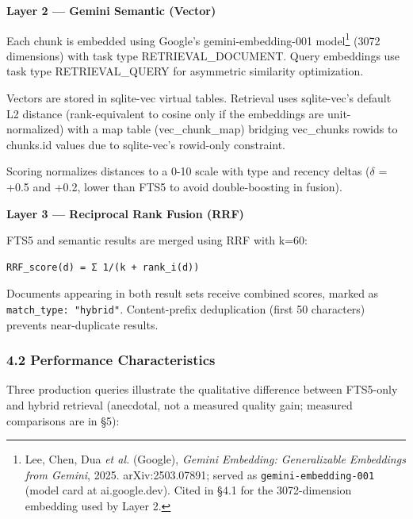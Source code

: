 \documentclass[
]{article}
\begin{document}
\textbf{Layer 2 --- Gemini Semantic (Vector)}

Each chunk is embedded using Google's gemini-embedding-001
model\footnote{Lee, Chen, Dua \emph{et al.} (Google), \emph{Gemini
  Embedding: Generalizable Embeddings from Gemini}, 2025.
  arXiv:2503.07891; served as \texttt{gemini-embedding-001} (model card
  at ai.google.dev). Cited in §4.1 for the 3072-dimension embedding used
  by Layer 2.} (3072 dimensions) with task type RETRIEVAL\_DOCUMENT.
Query embeddings use task type RETRIEVAL\_QUERY for asymmetric
similarity optimization.

Vectors are stored in sqlite-vec virtual tables. Retrieval uses
sqlite-vec's default L2 distance (rank-equivalent to cosine only if the
embeddings are unit-normalized) with a map table (vec\_chunk\_map)
bridging vec\_chunks rowids to chunks.id values due to sqlite-vec's
rowid-only constraint.

Scoring normalizes distances to a 0-10 scale with type and recency
deltas (\(\delta\) = +0.5 and +0.2, lower than FTS5 to avoid
double-boosting in fusion).

\textbf{Layer 3 --- Reciprocal Rank Fusion (RRF)}

FTS5 and semantic results are merged using RRF with k=60:

\begin{verbatim}
RRF_score(d) = Σ 1/(k + rank_i(d))
\end{verbatim}

Documents appearing in both result sets receive combined scores, marked
as \texttt{match\_type:\ "hybrid"}. Content-prefix deduplication (first
50 characters) prevents near-duplicate results.

\subsubsection{4.2 Performance
Characteristics}\label{performance-characteristics}

Three production queries illustrate the qualitative difference between
FTS5-only and hybrid retrieval (anecdotal, not a measured quality gain;
measured comparisons are in §5):
\end{document}
